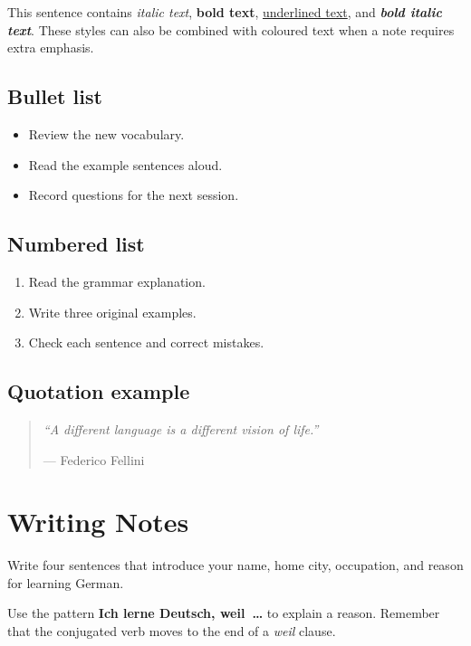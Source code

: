 \documentclass[11pt,openany]{book}
\newcommand{\GermanText}[1]{\textbf{#1}}
\newcommand{\LessonSection}[1]{\section{#1}}
\begin{document}
This sentence contains \textit{italic text}, \textbf{bold text},
\underline{underlined text}, and
\textbf{\textit{bold italic text}}. These styles can also be combined with
\textcolor{GermanRed}{coloured text} when a note requires extra emphasis.

%
%
%
\subsection*{Bullet list}

\begin{itemize}
  \item Review the new vocabulary.
  \item Read the example sentences aloud.
  \item Record questions for the next session.
\end{itemize}

\subsection*{Numbered list}

\begin{enumerate}
  \item Read the grammar explanation.
  \item Write three original examples.
  \item Check each sentence and correct mistakes.
\end{enumerate}

\subsection*{Quotation example}

\begin{quote}
  \itshape
  ``A different language is a different vision of life.''

  \hfill --- Federico Fellini
\end{quote}

\endgroup %
\LessonSection{Writing Notes}

Write four sentences that introduce your name, home city, occupation, and
reason for learning German.

\begin{InformationBox}
Use the pattern \GermanText{Ich lerne Deutsch, weil~\ldots} to explain a reason.
Remember that the conjugated verb moves to the end of a \emph{weil} clause.
\end{InformationBox}
\end{document}
